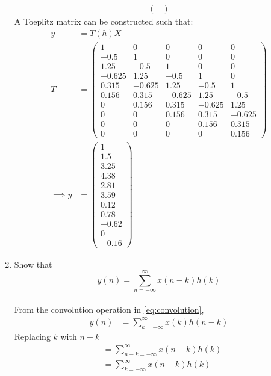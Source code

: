 \documentclass[journal,12pt,twocolumn]{IEEEtran}
\renewcommand\thesection{\arabic{section}}
\begin{document}
\begin{enumerate}[label=\thesection.\arabic*]
\begin{align}
\begin{pmatrix}
    \end{pmatrix}
\end{align}
A Toeplitz matrix can be constructed such that:
\begin{align}
    y &= T(h)X\\
    T &= \begin{pmatrix}
    1& 0 &0 &0 &0\\
    -0.5 &1 &0 &0 &0\\
    1.25 &-0.5 &1 &0& 0\\
    -0.625 &1.25 &-0.5 &1& 0\\
    0.315 &-0.625& 1.25 &-0.5& 1\\
    0.156 & 0.315 & -0.625& 1.25 &-0.5\\
    0 &0.156 & 0.315 & -0.625& 1.25\\
    0&0& 0.156 & 0.315 & -0.625\\
    0&0&0& 0.156 & 0.315\\
    0&0&0&0& 0.156
    \end{pmatrix}\\
    \implies y&=\begin{pmatrix}
    1\\1.5\\3.25\\4.38\\2.81\\3.59\\0.12\\0.78\\-0.62\\0\\-0.16
    \end{pmatrix}
\end{align}
\item Show that
\begin{equation}
y(n) =  \sum_{n=-\infty}^{\infty}x(n-k)h(k)
\end{equation}\\
\solution From the convolution operation in \eqref{eq:convolution}, 
\begin{align}
    y(n) &= \sum_{k=-\infty}^{\infty}x(k)h(n-k)
\end{align}
Replacing $k$ with $n-k$
\begin{align}
    &= \sum_{n-k=-\infty}^{\infty} x(n-k)h(k)\\
    &= \sum_{k=-\infty}^{\infty} x(n-k)h(k)
\end{align}
\end{enumerate}
%
\end{document}
